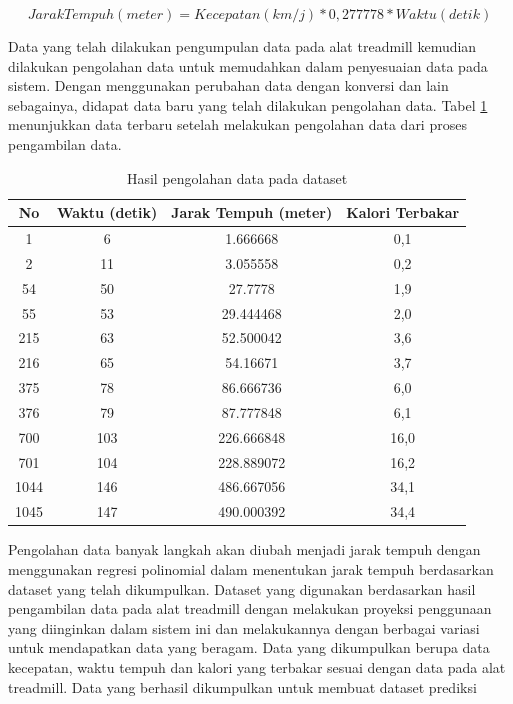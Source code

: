 \begin{equation}
  \label{eq:KonversiJarakTempuh}
  Jarak Tempuh(meter) = Kecepatan(km/j)*0,277778*Waktu(detik)
\end{equation}

Data yang telah dilakukan pengumpulan data pada alat treadmill kemudian dilakukan pengolahan data untuk memudahkan dalam penyesuaian data pada sistem. Dengan menggunakan perubahan data dengan konversi dan lain sebagainya, didapat data baru yang telah dilakukan pengolahan data. Tabel \ref{tb:OlahDatasetRegresi} menunjukkan data terbaru setelah melakukan pengolahan data dari proses pengambilan data.

\begin{longtable}{|c|c|c|c|}
  \caption{Hasil pengolahan data pada dataset}
  \label{tb:OlahDatasetRegresi}                                   \\
  \hline
  \rowcolor[HTML]{C0C0C0}
  \textbf{No} & \textbf{Waktu (detik)} & \textbf{Jarak Tempuh (meter)} & \textbf{Kalori Terbakar} \\
  \hline
  1   & 6    & 1.666668    & 0,1     \\
  \hline
  2   & 11    & 3.055558    & 0,2     \\
  \hline
  54   & 50    & 27.7778    & 1,9     \\
  \hline
  55   & 53    & 29.444468    & 2,0     \\
  \hline
  215   & 63    & 52.500042    & 3,6     \\
  \hline
  216   & 65    & 54.16671    & 3,7     \\
  \hline
  375   & 78    & 86.666736    & 6,0     \\
  \hline
  376   & 79    & 87.777848    & 6,1     \\
  \hline
  700   & 103    & 226.666848    & 16,0     \\
  \hline
  701   & 104    & 228.889072    & 16,2     \\
  \hline
  1044   & 146    & 486.667056    & 34,1     \\
  \hline
  1045   & 147    & 490.000392    & 34,4     \\
  \hline
\end{longtable}

Pengolahan data banyak langkah akan diubah menjadi jarak tempuh dengan menggunakan regresi polinomial dalam menentukan jarak tempuh berdasarkan dataset yang telah dikumpulkan. Dataset yang digunakan berdasarkan hasil pengambilan data pada alat treadmill dengan melakukan proyeksi penggunaan yang diinginkan dalam sistem ini dan melakukannya dengan berbagai variasi untuk mendapatkan data yang beragam. Data yang dikumpulkan berupa data kecepatan, waktu tempuh dan kalori yang terbakar sesuai dengan data pada alat treadmill. Data yang berhasil dikumpulkan untuk membuat dataset prediksi

